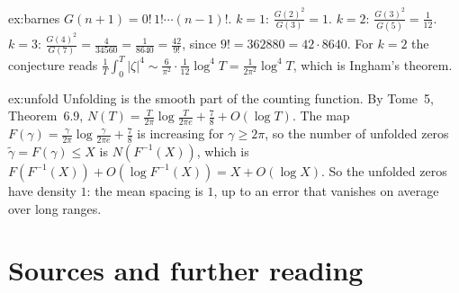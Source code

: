 \begin{solution}{ex:barnes}
\idea $G(n+1)=0!\,1!\cdots(n-1)!$.
\writeup $k=1$: $\frac{G(2)^2}{G(3)}=1$. $k=2$: $\frac{G(3)^2}{G(5)}=\frac1{12}$. $k=3$: $\frac{G(4)^2}{G(7)}=\frac4{34560}=\frac1{8640}=\frac{42}{9!}$, since $9!=362880=42\cdot8640$.
For $k=2$ the conjecture reads $\frac1T\int_0^T|\zeta|^4\sim\frac6{\pi^2}\cdot\frac1{12}\log^4T=\frac1{2\pi^2}\log^4T$, which is Ingham's theorem.
\end{solution}

\begin{solution}{ex:unfold}
\idea Unfolding is the smooth part of the counting function.
\writeup By Tome~5, Theorem~6.9, $N(T)=\frac T{2\pi}\log\frac T{2\pi e}+\frac78+O(\log T)$. The map $F(\gamma)=\frac\gamma{2\pi}\log\frac\gamma{2\pi e}+\frac78$ is increasing for $\gamma\ge2\pi$,
so the number of unfolded zeros $\tilde\gamma=F(\gamma)\le X$ is $N(F^{-1}(X))$, which is $F(F^{-1}(X))+O(\log F^{-1}(X))=X+O(\log X)$. So the unfolded zeros
have density $1$: the mean spacing is $1$, up to an error that vanishes on average over long ranges.
\end{solution}

\section*{Sources and further reading}

